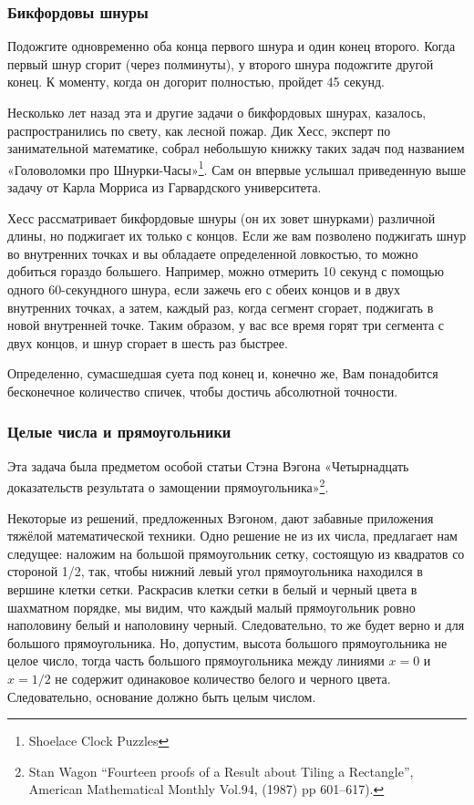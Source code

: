 \subsubsection*{Бикфордовы шнуры} %

Подожгите одновременно оба конца первого шнура и один конец второго. Когда первый шнур сгорит (через полминуты),  у второго шнура подожгите другой конец.  К моменту, когда он догорит полностью, пройдет 45 секунд.\heart


Несколько лет назад эта и другие задачи о бикфордовых шнурах, казалось, распространились по свету, как лесной пожар.
Дик Хесс, эксперт  по занимательной математике, 
собрал небольшую книжку таких задач %
под названием «Головоломки про Шнурки-Часы»\footnote{Shoelace Clock Puzzles}. 
Сам он впервые услышал приведенную выше задачу от Карла Морриса из Гарвардского университета.

Хесс рассматривает бикфордовые шнуры (он их зовет шнурками)  различной длины, но поджигает их только с концов.
Если же вам позволено поджигать шнур во внутренних точках и вы обладаете определенной ловкостью, то можно добиться гораздо большего. Например, можно отмерить 10 секунд с помощью одного 60-секундного шнура, если зажечь его с обеих концов и в двух внутренних точках, а затем, каждый раз, когда сегмент сгорает,  поджигать в новой  внутренней точке.
Таким образом, у вас все время горят  три сегмента  с двух концов,  и шнур сгорает в шесть раз быстрее.

Определенно, сумасшедшая суета под конец и, конечно же,
Вам понадобится бесконечное количество спичек, чтобы достичь абсолютной точности.






\subsubsection*{Целые числа и прямоугольники} %

Эта задача была предметом особой %
статьи Стэна Вэгона %
«Четырнадцать доказательств результата о замощении прямоугольника»\footnote{Stan Wagon “Fourteen proofs of a Result about Tiling a Rectangle”, American Mathematical Monthly  Vol.94, (1987) pp 601--617).}.


Некоторые из решений, предложенных Вэгоном, дают забавные приложения тяжёлой математической техники.
Одно решение не из их числа, предлагает нам следущее:
наложим на большой прямоугольник сетку,  состоящую из квадратов со стороной 1/2,  так, чтобы нижний  левый угол прямоугольника находился в вершине клетки сетки.  
Раскрасив клетки сетки в белый и черный цвета в шахматном порядке, 
мы видим, что каждый малый прямоугольник ровно наполовину белый и наполовину черный. Следовательно, то же будет верно и для большого  прямоугольника.
Но, допустим, высота большого  прямоугольника не  целое число, тогда часть 
большого  прямоугольника между линиями  $x=0$ и   $x=1/2$  не содержит одинаковое количество белого и черного цвета. 
Следовательно, основание должно быть целым числом.\heart


